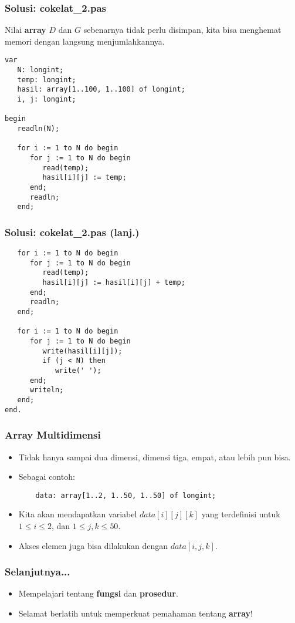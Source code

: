 \documentclass{beamer}
\begin{document}
\begin{frame}[fragile]
\frametitle{Solusi: cokelat\_2.pas}
Nilai \textbf{array} $D$ dan $G$ sebenarnya tidak perlu disimpan, kita bisa menghemat memori dengan langsung menjumlahkannya.
\begin{lstlisting}
var
   N: longint;
   temp: longint;
   hasil: array[1..100, 1..100] of longint;
   i, j: longint;

begin
   readln(N);

   for i := 1 to N do begin
      for j := 1 to N do begin
         read(temp);
         hasil[i][j] := temp;
      end;
      readln;
   end;
\end{lstlisting}
\end{frame}

\begin{frame}[fragile]
\frametitle{Solusi: cokelat\_2.pas (lanj.)}
\begin{lstlisting}
   for i := 1 to N do begin
      for j := 1 to N do begin
         read(temp);
         hasil[i][j] := hasil[i][j] + temp;
      end;
      readln;
   end;

   for i := 1 to N do begin
      for j := 1 to N do begin
         write(hasil[i][j]);
         if (j < N) then
            write(' ');
      end;
      writeln;
   end;
end.
\end{lstlisting}
\end{frame}

\begin{frame}[fragile]
\frametitle{Array Multidimensi}
\begin{itemize}
    \item Tidak hanya sampai dua dimensi, dimensi tiga, empat, atau lebih pun bisa.
    \item Sebagai contoh:
    \begin{lstlisting}
    data: array[1..2, 1..50, 1..50] of longint;
    \end{lstlisting}
    \item Kita akan mendapatkan variabel $data[i][j][k]$ yang terdefinisi untuk $1 \le i \le 2$, dan $1 \le j, k \le 50$.
    \item Akses elemen juga bisa dilakukan dengan $data[i,j,k]$.
\end{itemize}
\end{frame}

\begin{frame}
\frametitle{Selanjutnya...}
\begin{itemize}
    \item Mempelajari tentang \textbf{fungsi} dan \textbf{prosedur}.
    \item Selamat berlatih untuk memperkuat pemahaman tentang \textbf{array}!
\end{itemize}
\end{frame}
\end{document}
